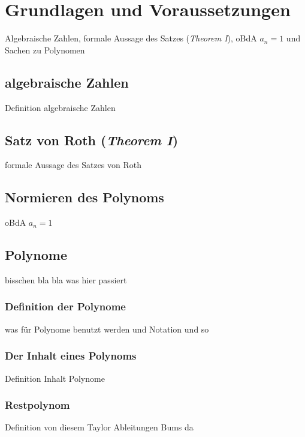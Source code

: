\documentclass[11pt]{article}
\begin{document}
    \section{Grundlagen und Voraussetzungen}
    \label{sec:basics}
        Algebraische Zahlen, formale Aussage des Satzes (\emph{Theorem I}), oBdA $a_n = 1$ und Sachen zu Polynomen
        
        \subsection{algebraische Zahlen}
        \label{subsec:algebraic-numbers}
            Definition algebraische Zahlen
        
        \subsection{Satz von Roth (\emph{Theorem I})}
        \label{subsec:th1}
            formale Aussage des Satzes von Roth
        
        \subsection{Normieren des Polynoms}
        \label{subsec:norm-poly}
            oBdA $a_n = 1$
        
        \subsection{Polynome}
        \label{subsec:polynomials}
            bisschen bla bla was hier passiert
        
            \subsubsection{Definition der Polynome}
            \label{subsubsec:poly-def}
                \textrm{was für Polynome benutzt werden und Notation und so}
            
            \subsubsection{Der Inhalt eines Polynoms}
            \label{subsubsec:content-poly}
                Definition Inhalt Polynome
            
            \subsubsection{Restpolynom}
            \label{subsubsec:rem-poly}
                Definition von diesem Taylor Ableitungen Bums da
            
\end{document}
